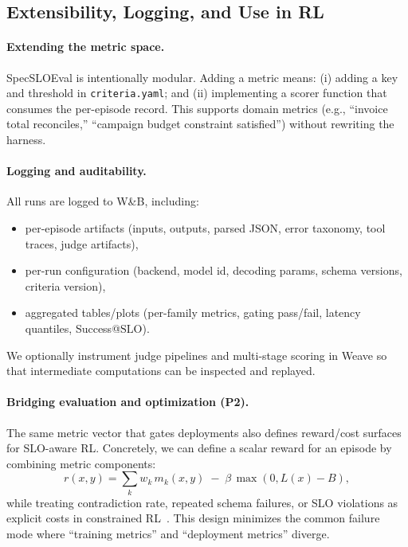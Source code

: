 \documentclass[11pt]{article}
\newcommand{\slo}{\ensuremath{\mathrm{SLO}}}
\begin{document}
\subsection{Extensibility, Logging, and Use in RL}
\label{sec:extensibility-rl}

\paragraph{Extending the metric space.}
SpecSLOEval is intentionally modular.
Adding a metric means:
(i) adding a key and threshold in \texttt{criteria.yaml}; and
(ii) implementing a scorer function that consumes the per-episode record.
This supports domain metrics (e.g., “invoice total reconciles,” “campaign budget constraint satisfied”) without rewriting the harness.

\paragraph{Logging and auditability.}
All runs are logged to W\&B, including:
\begin{itemize}[leftmargin=12pt]
    \item per-episode artifacts (inputs, outputs, parsed JSON, error taxonomy, tool traces, judge artifacts),
    \item per-run configuration (backend, model id, decoding params, schema versions, criteria version),
    \item aggregated tables/plots (per-family metrics, gating pass/fail, latency quantiles, Success@\slo).
\end{itemize}
We optionally instrument judge pipelines and multi-stage scoring in Weave so that intermediate computations can be inspected and replayed.

\paragraph{Bridging evaluation and optimization (P2).}
The same metric vector that gates deployments also defines reward/cost surfaces for SLO-aware RL.
Concretely, we can define a scalar reward for an episode by combining metric components:
\[
r(x,y) = \sum_{k} w_k\, m_k(x,y) \;-\; \beta\,\max(0, L(x)-B),
\]
while treating contradiction rate, repeated schema failures, or SLO violations as explicit costs in constrained RL~\citep{altman1999cmdp,achiam2017cpo}.
This design minimizes the common failure mode where “training metrics” and “deployment metrics” diverge.
\end{document}
